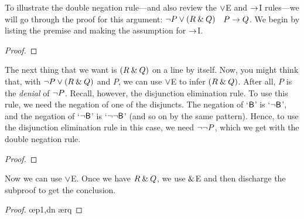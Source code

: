 
To illustrate the double negation rule---and also review the $\vee$E and $\rightarrow$I rules---we will go through the proof for this argument: ${\neg} P \vee (R \mathbin{\&} Q)$ \therefore\ $P \rightarrow Q$. We begin by listing the premise and making the assumption for $\rightarrow$I.

\begin{proof}
	 	
	\open
\end{proof}
The next thing that we want is $(R \mathbin{\&} Q)$ on a line by itself. Now, you might think that, with ${\neg} P \vee (R \mathbin{\&} Q)$ and $P$, we can use $\vee$E to infer $(R \mathbin{\&} Q)$. After all, $P$ is the \textit{denial} of ${\neg} P$. Recall, however, the disjunction elimination rule.
\noindent To use this rule, we need the negation of one of the disjuncts. The negation of `$\mathsf{B}$' is `${\neg}\mathsf{B}$', and the negation of 
`${\neg}\mathsf{B}$' is `${\neg}{\neg}\mathsf{B}$' (and so on by the same pattern). Hence, to use the disjunction elimination rule in this case, we need ${\neg}{\neg} P$, which we get with the double negation rule.

\begin{proof}
	 	
	\open
		 
\end{proof}
Now we can use $\vee$E. Once we have $R \mathbin{\&} Q$, we use $\mathbin{\&}$E and then discharge the subproof to get the conclusion.

\begin{proof}
	 	
	\open
		 
		 \oe{p1,dn}
		 \ae{rq}
	\close
\end{proof}




